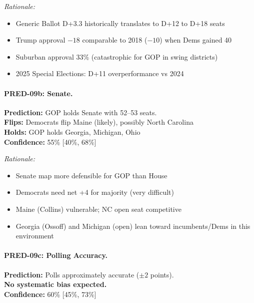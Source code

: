 \textit{Rationale:}
\begin{itemize}
    \item Generic Ballot D+3.3 historically translates to D+12 to D+18 seats
    \item Trump approval $-18$ comparable to 2018 ($-10$) when Dems gained 40
    \item Suburban approval 33\% (catastrophic for GOP in swing districts)
    \item 2025 Special Elections: D+11 overperformance vs 2024
\end{itemize}

\paragraph{PRED-09b: Senate.}

\begin{tcolorbox}[colback=blue!5!white, colframe=blue!75!black, title=PRED-09b: Senate]
\textbf{Prediction:} GOP holds Senate with 52--53 seats. \\
\textbf{Flips:} Democrats flip Maine (likely), possibly North Carolina \\
\textbf{Holds:} GOP holds Georgia, Michigan, Ohio \\
\textbf{Confidence:} 55\% [40\%, 68\%]
\end{tcolorbox}

\textit{Rationale:}
\begin{itemize}
    \item Senate map more defensible for GOP than House
    \item Democrats need net +4 for majority (very difficult)
    \item Maine (Collins) vulnerable; NC open seat competitive
    \item Georgia (Ossoff) and Michigan (open) lean toward incumbents/Dems in this environment
\end{itemize}

\paragraph{PRED-09c: Polling Accuracy.}

\begin{tcolorbox}[colback=blue!5!white, colframe=blue!75!black, title=PRED-09c: Polling Accuracy]
\textbf{Prediction:} Polls approximately accurate ($\pm 2$ points). \\
\textbf{No systematic bias expected.} \\
\textbf{Confidence:} 60\% [45\%, 73\%]
\end{tcolorbox}

